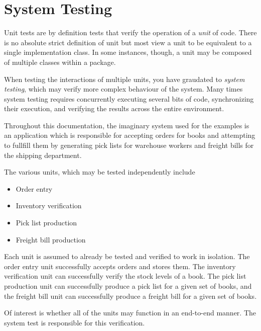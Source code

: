\chapter{System Testing}

Unit tests are by definition tests that verify the operation
of a \emph{unit} of code.  There is no absolute strict definition
of unit but most view a unit to be equivalent to a single 
implementation class.  In some instances, though, a unit may be
composed of multiple classes within a package.  

When testing the interactions of multiple units, you have
graudated to \emph{system testing}, which may verify
more complex behaviour of the system.  Many times system
testing requires concurrently executing several bits of code,
synchronizing their execution, and verifying the results
across the entire environment.

Throughout this documentation, the imaginary system used for
the examples is an application which is responsible for accepting
orders for books and attempting to fullfill them by generating
pick lists for warehouse workers and freight bills for
the shipping department.

The various units, which may be tested independently include

\begin{itemize}
	\item Order entry
	\item Inventory verification
	\item Pick list production
	\item Freight bill production
\end{itemize}

Each unit is assumed to already be tested and verified
to work in isolation.  The order entry unit successfully
accepts orders and stores them.  The inventory verification
unit can successfully verify the stock levels of a book.
The pick list production unit can successfully produce
a pick list for a given set of books, and the freight bill
unit can successfully produce a freight bill for a given
set of books.

Of interest is whether all of the units may function
in an end-to-end manner.  The system test is responsible
for this verification.
